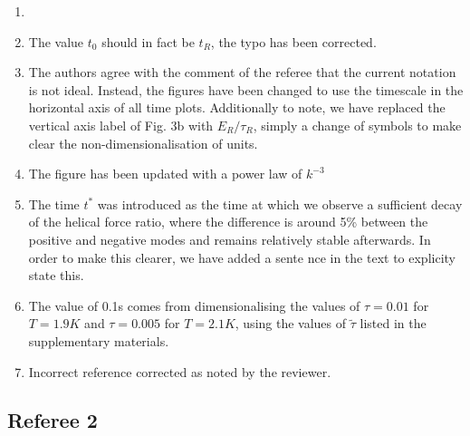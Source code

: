 \documentclass[a4paper,10pt]{article}
\begin{document}
\begin{enumerate}
    \item 
    \item The value $t_0$ should in fact be $t_R$, the typo has been corrected.
    \item The authors agree with the comment of the referee that the current notation is not ideal. Instead, the figures have been changed to use the timescale in the horizontal axis of all time plots. Additionally to note, we have replaced the vertical axis label of Fig. 3b with $E_R/\tau_R$, simply a change of symbols to make clear the non-dimensionalisation of units.
    \item The figure has been updated with a power law of $k^{-3}$ 
    \item The time $t^*$ was introduced as the time at which we observe a sufficient decay of the helical force ratio, where the difference is around 5\% between the positive and negative modes and remains relatively stable afterwards. In order to make this clearer, we have added a sente nce in the text to explicity state this.
    \item The value of 0.1s comes from dimensionalising the values of $\tau=0.01$ for $T=1.9K$ and $\tau=0.005$ for $T=2.1K$, using the values of $\tilde{\tau}$ listed in the supplementary materials. 
    \item Incorrect reference corrected as noted by the reviewer.
\end{enumerate}

\subsection*{Referee 2}
\end{document}
